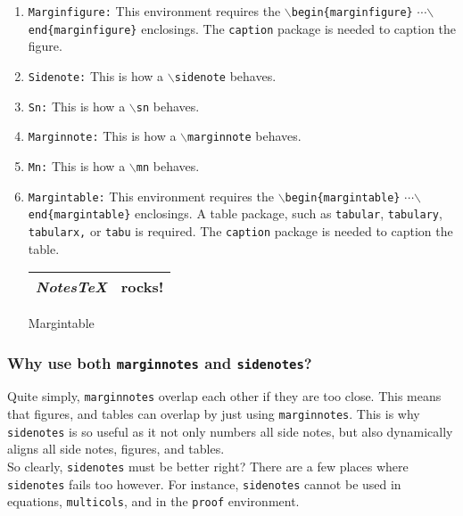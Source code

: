 \documentclass[10pt]{article}
\begin{document}
	\begin{enumerate}
		\item \texttt{Marginfigure:} This environment requires the \texttt{$\backslash$begin\{marginfigure\}} {$\cdots$}\newline\texttt{$\backslash$end\{marginfigure\}} enclosings. The \texttt{caption} package is needed to caption the figure.
		\item \texttt{Sidenote:} This is how a \texttt{$\backslash$sidenote} behaves.
		\item \texttt{Sn:} This is how a \texttt{$\backslash$sn} behaves.
		\item \texttt{Marginnote:} This is how a \texttt{$\backslash$marginnote} behaves.
		\item \texttt{Mn:} This is how a \texttt{$\backslash$mn} behaves.
		\item \texttt{Margintable:} This environment requires the \texttt{$\backslash$begin\{margintable\}} {$\cdots$}\newline\texttt{$\backslash$end\{margintable\}} enclosings. A table package, such as \texttt{tabular}, \texttt{tabulary}, \texttt{tabularx,} or \texttt{tabu} is required. The \texttt{caption} package is needed to caption the table.
		\begin{margintable}
			\begin{tabularx}{\marginparwidth}{|X|X|}
			\hline
			\textit{NotesTeX} & \textbf{rocks!}\\
			\hline
			\end{tabularx}
			\caption{Margintable}
		\end{margintable}
	\end{enumerate}
	\subsubsection{Why use both \texttt{marginnotes} and \texttt{sidenotes}?}
	Quite simply, \texttt{marginnotes} overlap each other if they are too close. This means that figures, and tables can overlap by just using \texttt{marginnotes}. This is why \texttt{sidenotes} is so useful as it not only numbers all side notes, but also dynamically aligns all side notes, figures, and tables.\\


	\noindent So clearly, \texttt{sidenotes} must be better right? There are a few places where \texttt{sidenotes} fails too however. For instance, \texttt{sidenotes} cannot be used in equations, \texttt{multicols}, and in the \texttt{proof} environment.
\end{document}
